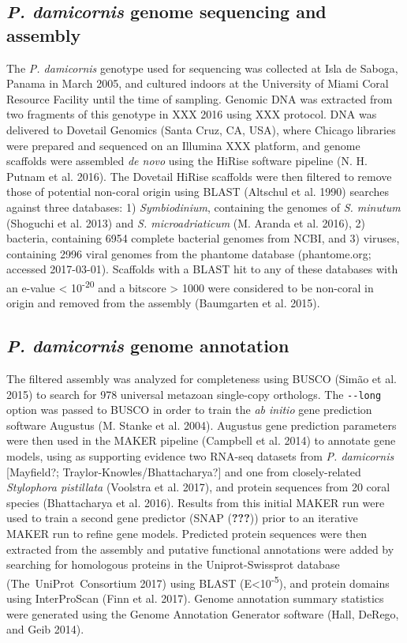 \documentclass[]{elsarticle} %
\begin{document}
\subsection{\texorpdfstring{\emph{P. damicornis} genome sequencing and
assembly}{P. damicornis genome sequencing and assembly}}\label{p.-damicornis-genome-sequencing-and-assembly}

The \emph{P. damicornis} genotype used for sequencing was collected at
Isla de Saboga, Panama in March 2005, and cultured indoors at the
University of Miami Coral Resource Facility until the time of sampling.
Genomic DNA was extracted from two fragments of this genotype in XXX
2016 using XXX protocol. DNA was delivered to Dovetail Genomics (Santa
Cruz, CA, USA), where Chicago libraries were prepared and sequenced on
an Illumina XXX platform, and genome scaffolds were assembled \emph{de
novo} using the HiRise software pipeline (N. H. Putnam et al. 2016). The
Dovetail HiRise scaffolds were then filtered to remove those of
potential non-coral origin using BLAST (Altschul et al. 1990) searches
against three databases: 1) \emph{Symbiodinium}, containing the genomes
of \emph{S. minutum} (Shoguchi et al. 2013) and \emph{S.
microadriaticum} (M. Aranda et al. 2016), 2) bacteria, containing 6954
complete bacterial genomes from NCBI, and 3) viruses, containing 2996
viral genomes from the phantome database (phantome.org; accessed
2017-03-01). Scaffolds with a BLAST hit to any of these databases with
an e-value \textless{} 10\textsuperscript{-20} and a bitscore
\textgreater{} 1000 were considered to be non-coral in origin and
removed from the assembly (Baumgarten et al. 2015).

\subsection{\texorpdfstring{\emph{P. damicornis} genome
annotation}{P. damicornis genome annotation}}\label{p.-damicornis-genome-annotation}

The filtered assembly was analyzed for completeness using BUSCO (Simão
et al. 2015) to search for 978 universal metazoan single-copy orthologs.
The \texttt{-\/-long} option was passed to BUSCO in order to train the
\emph{ab initio} gene prediction software Augustus (M. Stanke et al.
2004). Augustus gene prediction parameters were then used in the MAKER
pipeline (Campbell et al. 2014) to annotate gene models, using as
supporting evidence two RNA-seq datasets from \emph{P. damicornis}
{[}Mayfield?; Traylor-Knowles/Bhattacharya?{]} and one from
closely-related \emph{Stylophora pistillata} (Voolstra et al. 2017), and
protein sequences from 20 coral species (Bhattacharya et al. 2016).
Results from this initial MAKER run were used to train a second gene
predictor (SNAP ({\textbf{???}})) prior to an iterative MAKER run to
refine gene models. Predicted protein sequences were then extracted from
the assembly and putative functional annotations were added by searching
for homologous proteins in the Uniprot-Swissprot database
(The~UniProt~Consortium 2017) using BLAST
(E\textless{}10\textsuperscript{-5}), and protein domains using
InterProScan (Finn et al. 2017). Genome annotation summary statistics
were generated using the Genome Annotation Generator software (Hall,
DeRego, and Geib 2014).
\end{document}
